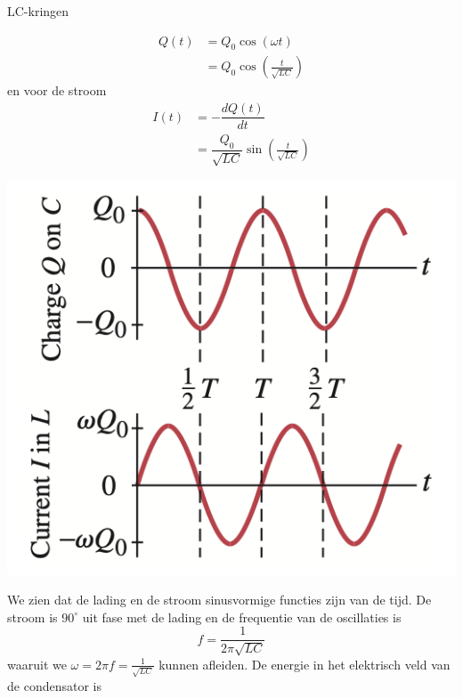 \begin{app}[LC-kringen]{LC-kringen}
    \begin{minipage}{.71\textwidth}
        \begin{align*}
            Q(t) &= Q_{0}\cos(\omega t) \\
                 &= Q_{0}\cos(\tfrac{t}{\sqrt{LC}})
        \end{align*}
        \hspace{-0.6cm} en voor de stroom
        \begin{align*}
            I(t) &= -\dfrac{dQ(t)}{dt} \\
                 &= \dfrac{Q_{0}}{\sqrt{LC}}\sin(\tfrac{t}{\sqrt{LC}})
        \end{align*}
        \vspace{0.1cm}
    \end{minipage}
    \begin{minipage}{.25\textwidth}
        \hspace{-0.45cm}\includegraphics[scale = 0.45]{Images/Magnetisme/LCKringGrafiek}
    \end{minipage}
    We zien dat de lading en de stroom sinusvormige functies zijn van de tijd. De stroom is $90^{\circ}$ uit fase met de lading en de frequentie van de oscillaties is
    \begin{equation*}
        f = \dfrac{1}{2\pi\sqrt{LC}}
    \end{equation*}
    waaruit we $\omega = 2\pi f = \tfrac{1}{\sqrt{LC}}$ kunnen afleiden. De energie in het elektrisch veld van de condensator is


\end{app}
